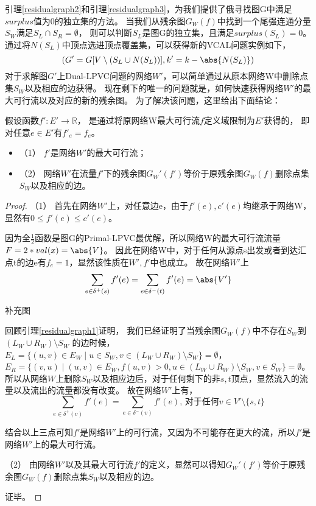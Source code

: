 引理\ref{residualgraph2}和引理\ref{residualgraph3}，为我们提供了俄寻找图G中满足$surplus$值为0的独立集的方法。
当我们从残余图$G_W(f)$中找到一个尾强连通分量$S_W$满足$S_L \cap S_R = \emptyset$，
则可以判断$S_L$是图G的独立集，且满足$surplus(S_L) = 0$。
通过将$N(S_L)$中顶点选进顶点覆盖集，可以获得新的VCAL问题实例如下，
\[(G' = G[V \setminus (S_L \cup N(S_L))], k' = k - \abs{N(S_L)})\]
对于求解图$G'$上Dual-LPVC问题的网络$W'$，可以简单通过从原本网络W中删除点集$S_W$以及相应的边获得。
现在剩下的唯一的问题就是，如何快速获得网络$W'$的最大可行流以及对应的新的残余图。
为了解决该问题，这里给出下面结论：
\begin{claim}
假设函数$f':E' \rightarrow \mathbb{R}$， 是通过将原网络W最大可行流$f$定义域限制为$E'$获得的，
即对任意$e \in E'$有$f'_e = f_e$。
\begin{itemize}
  \item {（1）} $f'$是网络$W'$的最大可行流；
  \item {（2）} 网络$W'$在流量$f'$下的残余图$G_W'(f')$等价于原残余图$G_W(f)$删除点集$S_W$以及相应的边。
\end{itemize}
\end{claim}
\begin{proof}

（1）
首先在网络$W'$上，对任意边e，由于$f'(e), c'(e)$均继承于网络W，显然有$0 \le f'(e) \le c'(e)$。

因为全$\frac{1}{2}$函数是图G的Primal-LPVC最优解，所以网络W的最大可行流流量$F = 2 * val(x) = \abs{V}$。
因此在网络W中，对于任何从源点s出发或者到达汇点t的边e有$f_e = 1$，显然该性质在$W', f'$中也成立。
故在网络$W'$上
\begin{equation*}
    \sum_{e\in \delta^+(s)}{f'(e)} =\sum_{e\in \delta^-(t)}{f'(e)} = \abs{V'}
\end{equation*}

\textcolor[rgb]{1.00,0.00,0.00}{补充图}

回顾引理\ref{residualgraph1}证明，
我们已经证明了当残余图$G_W(f)$中不存在$S_W$到$(L_W \cup R_W) \setminus S_W$ 的边时候，
$E_L = \{(u, v) \in E_W\;|\;u \in S_W,v \in (L_W \cup R_W) \setminus S_W\}=\emptyset$，
$E_R = \{(v, u)\;|\;(u, v) \in E_W,f(u, v) > 0,u \in (L_W \cup R_W) \setminus S_W,v \in S_W\}=\emptyset$。
所以从网络$W$上删除$S_W$以及相应边后，对于任何剩下的非$s, t$顶点，显然流入的流量以及流出的流量都没有改变。
故在网络$W'$上有，
\begin{equation*}
    \sum_{e\in \delta^+(v)}{f'(e)}=\sum_{e\in \delta^-(v)}{f'(e)}\mbox{, 对于任何} v \in V' \setminus \{s, t\}
\end{equation*}

结合以上三点可知$f'$是网络$W'$上的可行流，又因为不可能存在更大的流，所以$f'$是网络$W'$上的最大可行流。

（2）
由网络$W'$以及其最大可行流$f'$的定义，显然可以得知$G_W'(f')$等价于原残余图$G_W(f)$删除点集$S_W$以及相应的边。

证毕。
\end{proof}

